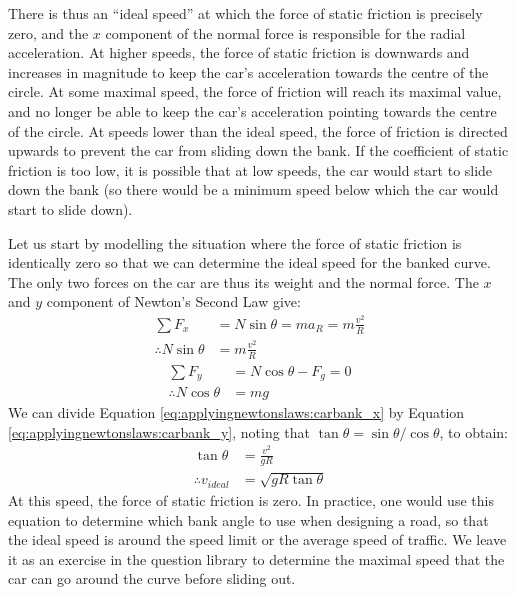 There is thus an ``ideal speed'' at which the force of static friction is precisely zero, and the $x$ component of the normal force is responsible for the radial acceleration. At higher speeds, the force of static friction is downwards and increases in magnitude to keep the car's acceleration towards the centre of the circle. At some maximal  speed, the force of friction will reach its maximal value, and no longer be able to keep the car's acceleration pointing towards the centre of the circle. At speeds lower than the ideal speed, the force of friction is directed upwards to prevent the car from sliding down the bank. If the coefficient of static friction is too low, it is possible that at low speeds, the car would start to slide down the bank (so there would be a minimum speed below which the car would start to slide down). 

Let us start by modelling the situation where the force of static friction is identically zero so that we can determine the ideal speed for the banked curve. The only two forces on the car are thus its weight and the normal force. The $x$ and $y$ component of Newton's Second Law give:
\begin{align}
\label{eq:applyingnewtonslaws:carbank_x}
\sum F_x &= N\sin\theta = ma_R=m\frac{v^2}{R}\nonumber\\
\therefore N\sin\theta &= m\frac{v^2}{R}
\end{align}
\begin{align}
\label{eq:applyingnewtonslaws:carbank_y}
\sum F_y &= N\cos\theta-F_g = 0\nonumber\\
\therefore N\cos\theta&=mg
\end{align}
We can divide Equation \ref{eq:applyingnewtonslaws:carbank_x} by Equation \ref{eq:applyingnewtonslaws:carbank_y}, noting that $\tan\theta=\sin\theta/\cos\theta$, to obtain:
\begin{align*}
\tan\theta &= \frac{v^2}{gR}\\
\therefore v_{ideal} &=\sqrt{gR\tan\theta}
\end{align*}
At this speed, the force of static friction is zero. In practice, one would use this equation to determine which bank angle to use when designing a road, so that the ideal speed is around the speed limit or the average speed of traffic. We leave it as an exercise in the question library to determine the maximal speed that the car can go around the curve before sliding out.

